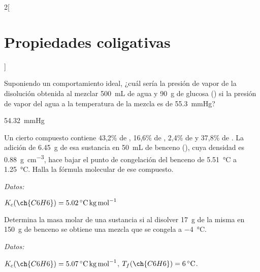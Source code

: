 \documentclass[10pt]{article}
\newenvironment{gexdatos}{
      \vspace{2pt}
      \noindent\textit{Datos:}
    }{\vspace{5pt}}
\begin{document}
\begin{multicols}{2}[
  \section{Propiedades coligativas}
  ]
  \begin{exercise}[
      tags    = {termodinámica, entalpía, entalpia de reacción, calor},
      topics  = {química, termoquímica, termodinámica},
      source  = {FQ 1B OXF 2015, p79, e44},
    ]
    Suponiendo un comportamiento ideal, ¿cuál sería la presión de vapor de la disolución obtenida al mezclar \SI{500}{\milli\liter} de agua y \SI{90}{\gram} de glucosa () si la presión de vapor del agua a la temperatura de la mezcla es de \SI{55.3}{\mmHg}?
  \end{exercise}

  \begin{solution}
    \SI{54.32}{\mmHg}
  \end{solution}




  \begin{exercise}[
      tags    = {termodinámica, entalpía, entalpia de reacción, calor},
      topics  = {química, termoquímica, termodinámica},
      source  = {FQ 1B OXF 2015, p79, e46},
    ]
    Un cierto compuesto contiene 43,2\% de , 16,6\% de , 2,4\% de  y 37,8\% de . La adición de \SI{6.45}{\gram} de esa sustancia en \SI{50}{\milli\liter} de benceno (), cuya densidad es \SI{0.88}{\gram\per\cubic\centi\meter}, hace bajar el punto de congelación del benceno de \SI{5.51}{\celsius} a \SI{1.25}{\celsius}. Halla la fórmula molecular de ese compuesto.

    \begin{gexdatos}
      \( K_c (\ch{C6H6}) = \SI{5.02}{\celsius\kilo\gram\per\mole} \)
    \end{gexdatos}
  \end{exercise}

  \begin{solution}
  \end{solution}



  \begin{exercise}[
      tags    = {termodinámica, entalpía, entalpia de reacción, calor},
      topics  = {química, termoquímica, termodinámica},
      source  = {FQ 1B SAN 2015, p94, e54},
    ]
    Determina la masa molar de una sustancia si al disolver \SI{17}{\gram} de la misma en \SI{150}{\gram} de benceno se obtiene una mezcla que se congela a \SI{-4}{\celsius}.

    \begin{gexdatos}
      \( K_c (\ch{C6H6}) = \SI{5.07}{\celsius\kilo\gram\per\mole} \),
      \( T_f (\ch{C6H6}) = \SI{6}{\celsius} \).
    \end{gexdatos}
  \end{exercise}


\end{multicols}
\end{document}
